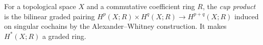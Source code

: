 
For a topological space $X$ and a commutative coefficient ring $R$, the \emph{cup product} is the bilinear graded pairing $H^p(X;R)\times H^q(X;R)\to H^{p+q}(X;R)$ induced on singular cochains by the Alexander--Whitney construction. It makes $H^*(X;R)$ a graded ring.
